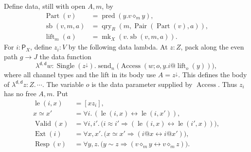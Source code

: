 \begin{definition}
\label{rel-lifts}
Define data, still with open \(A,m\), by
\[
\begin{aligned}
 \operatorname{Part}(v)&=\operatorname{pred}(y.v\diamond_m y),\\
 \operatorname{sb}(v,m,a)&=\operatorname{qry}_R
                    (m,\operatorname{Pair}(\operatorname{Part}(v),a)),\\
 \operatorname{lift}_m(a)&=\operatorname{mk}_X(v.\operatorname{sb}(v,m,a)).
\end{aligned}
\]
For \(i:\mathsf P_X\), define \(z_i:V\) by the following data
lambda.  At \(z:Z\), pack along the even path \(g\to J\) the
data function
\[
 \lambda^{\mathsf d,\mathsf d}w:
             \operatorname{Single}(z^\downarrow).
 \operatorname{send}_n
    \bigl(\operatorname{Access}
          (w;o,y.i@\operatorname{lift}_o(y))\bigr),
\]
where all channel types and the lift in its body use
\(A=z^\downarrow\).  This defines the body of
\(\lambda^{\mathsf d,\mathsf d}z:Z.\,\cdots\).
The variable \(o\) is the data parameter supplied by
\(\operatorname{Access}\).  Thus \(z_i\) has no free \(A,m\).
Put
\[
\begin{aligned}
 \operatorname{le}(i,x)&=[x z_i],\\
 x\simeq x'&=\forall i.\,(\operatorname{le}(i,x)\leftrightarrow \operatorname{le}(i,x')),\\
 \operatorname{Valid}(x)&=\forall i,i'.\,
       \bigl(i\approx i'\Rightarrow
                    (\operatorname{le}(i,x)\leftrightarrow \operatorname{le}(i',x))\bigr),\\
 \operatorname{Ext}(i)&=\forall x,x'.\,
       \bigl(x\simeq x'\Rightarrow(i@x\leftrightarrow i@x')\bigr),\\
 \operatorname{Resp}(v)&=\forall y,z.\,
       \bigl(y\sim z\Rightarrow
                    (v\diamond_m y\leftrightarrow v\diamond_m z)\bigr).
\end{aligned}
\]
\end{definition}


